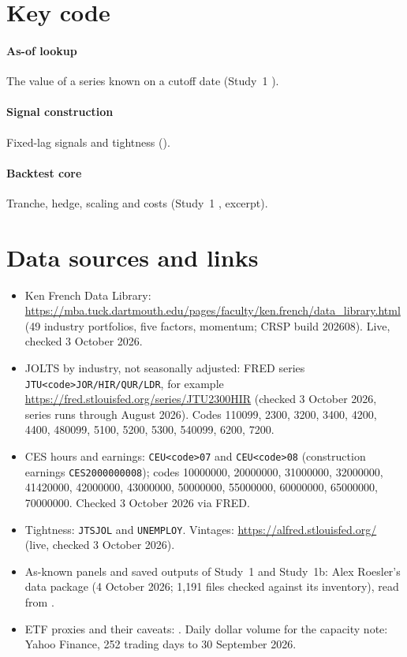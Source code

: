 \documentclass[11pt,letterpaper]{article}
\begin{document}
\section{Key code}\label{app:code}
\paragraph{As-of lookup} The value of a series known on a cutoff date (Study~1 ).

\paragraph{Signal construction} Fixed-lag signals and tightness ().

\paragraph{Backtest core} Tranche, hedge, scaling and costs (Study~1 , excerpt).


\section{Data sources and links}\label{app:data}
\begin{itemize}
  \item Ken French Data Library: \url{https://mba.tuck.dartmouth.edu/pages/faculty/ken.french/data_library.html} (49 industry portfolios, five factors, momentum; CRSP build 202608). Live, checked 3 October 2026.
  \item JOLTS by industry, not seasonally adjusted: FRED series \texttt{JTU<code>JOR/HIR/QUR/LDR}, for example \url{https://fred.stlouisfed.org/series/JTU2300HIR} (checked 3 October 2026, series runs through August 2026). Codes 110099, 2300, 3200, 3400, 4200, 4400, 480099, 5100, 5200, 5300, 540099, 6200, 7200.
  \item CES hours and earnings: \texttt{CEU<code>07} and \texttt{CEU<code>08} (construction earnings \texttt{CES2000000008}); codes 10000000, 20000000, 31000000, 32000000, 41420000, 42000000, 43000000, 50000000, 55000000, 60000000, 65000000, 70000000. Checked 3 October 2026 via FRED.
  \item Tightness: \texttt{JTSJOL} and \texttt{UNEMPLOY}. Vintages: \url{https://alfred.stlouisfed.org/} (live, checked 3 October 2026).
  \item As-known panels and saved outputs of Study~1 and Study~1b: Alex Roesler's data package (4 October 2026; 1,191 files checked against its inventory), read from .
  \item ETF proxies and their caveats: . Daily dollar volume for the capacity note: Yahoo Finance, 252 trading days to 30 September 2026.
\end{itemize}
\end{document}
